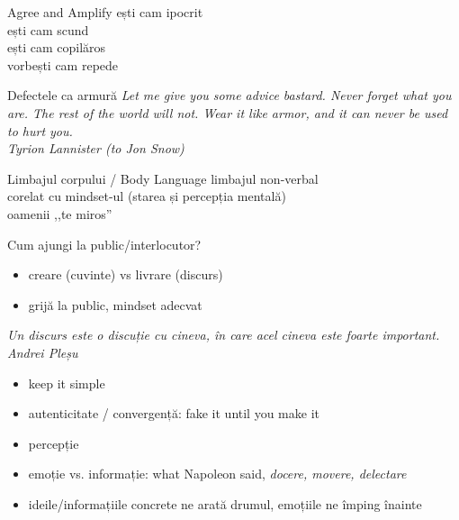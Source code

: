 \documentclass{beamer}
\begin{document}
\begin{frame}{Agree and Amplify}
  \centering
  \pause
  ești cam ipocrit\\
  \vspace{3mm}
  \pause
  ești cam scund\\
  \vspace{3mm}
  \pause
  ești cam copilăros\\
  \vspace{3mm}
  \pause
  vorbești cam repede\\
\end{frame}

\begin{frame}{Defectele ca armură}
  \centering
  \textit{Let me give you some advice bastard. Never forget what you are. The rest of the world will not. Wear it like armor, and it can never be used to hurt you.}\\
  \vspace{3mm}
  \hfill \textit{Tyrion Lannister (to Jon Snow)}
\end{frame}

\begin{frame}{Limbajul corpului / Body Language}
  \centering
  \pause
  limbajul non-verbal\\
  \vspace{3mm}
  \pause
  corelat cu mindset-ul (starea și percepția mentală)\\
  \vspace{3mm}
  \pause
  oamenii ,,te miros''
\end{frame}

\begin{frame}{Cum ajungi la public/interlocutor?}
  \begin{itemize}
    \pause
    \item creare (cuvinte) vs livrare (discurs)
    \pause
    \item grijă la public, mindset adecvat
  \end{itemize}
  \centering
  \pause
  \vspace{3mm}
  \textit{Un discurs este o discuție cu cineva, în care acel cineva este foarte important.}\\
  \vspace{3mm}
  \hfill \textit{Andrei Pleșu}\\
  \vspace{3mm}
  \begin{itemize}
    \pause
    \item keep it simple
    \pause
    \item autenticitate / convergență: fake it until you make it
    \pause
    \item percepție
    \pause
    \item emoție vs. informație: what Napoleon said, \textit{docere, movere, delectare}
    \pause
    \item ideile/informațiile concrete ne arată drumul, emoțiile ne împing înainte
  \end{itemize}
\end{frame}
\end{document}
